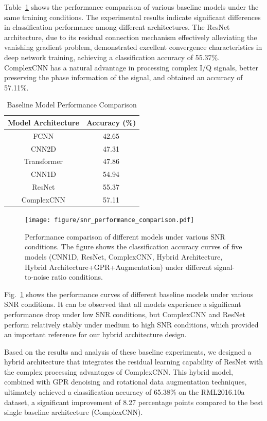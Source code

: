 \documentclass[conference]{IEEEtran}
\begin{document}
Table~\ref{tab:baseline_comparison} shows the performance comparison of various baseline models under the same training conditions. The experimental results indicate significant differences in classification performance among different architectures. The ResNet architecture, due to its residual connection mechanism effectively alleviating the vanishing gradient problem, demonstrated excellent convergence characteristics in deep network training, achieving a classification accuracy of 55.37\%. ComplexCNN has a natural advantage in processing complex I/Q signals, better preserving the phase information of the signal, and obtained an accuracy of 57.11\%.

\begin{table}[!htbp]
\centering
\caption{Baseline Model Performance Comparison}
\label{tab:baseline_comparison}
\begin{tabular}{@{}cc@{}}
\toprule
Model Architecture & Accuracy (\%) \\
\midrule
FCNN & 42.65 \\
CNN2D & 47.31 \\
Transformer & 47.86 \\
CNN1D & 54.94 \\
ResNet & 55.37 \\
ComplexCNN & 57.11 \\
\bottomrule
\end{tabular}
\end{table}

\begin{figure}[htbp]
\centering
\texttt{[image: figure/snr\_performance\_comparison.pdf]}
\caption{Performance comparison of different models under various SNR conditions. The figure shows the classification accuracy curves of five models (CNN1D, ResNet, ComplexCNN, Hybrid Architecture, Hybrid Architecture+GPR+Augmentation) under different signal-to-noise ratio conditions.}
\label{fig:snr_performance}
\end{figure}

Fig.~\ref{fig:snr_performance} shows the performance curves of different baseline models under various SNR conditions. It can be observed that all models experience a significant performance drop under low SNR conditions, but ComplexCNN and ResNet perform relatively stably under medium to high SNR conditions, which provided an important reference for our hybrid architecture design.

Based on the results and analysis of these baseline experiments, we designed a hybrid architecture that integrates the residual learning capability of ResNet with the complex processing advantages of ComplexCNN. This hybrid model, combined with GPR denoising and rotational data augmentation techniques, ultimately achieved a classification accuracy of 65.38\% on the RML2016.10a dataset, a significant improvement of 8.27 percentage points compared to the best single baseline architecture (ComplexCNN).
\end{document}
